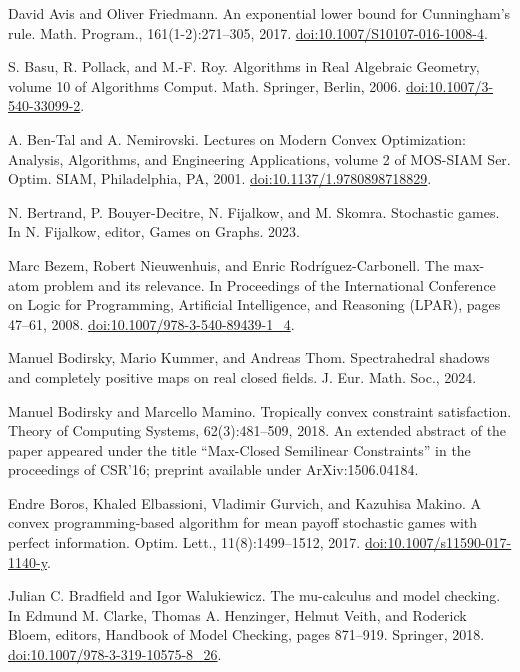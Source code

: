  David Avis and Oliver Friedmann. An exponential lower bound for Cunningham’s rule. Math. Program., 161(1-2):271–305, 2017. \href{https://doi.org/10.1007/S10107-016-1008-4}{doi:10.1007/S10107-016-1008-4}.

 S. Basu, R. Pollack, and M.-F. Roy. Algorithms in Real Algebraic Geometry, volume 10 of Algorithms Comput. Math. Springer, Berlin, 2006. \href{https://doi.org/10.1007/3-540-33099-2}{doi:10.1007/3-540-33099-2}.

 A. Ben-Tal and A. Nemirovski. Lectures on Modern Convex Optimization: Analysis, Algorithms, and Engineering Applications, volume 2 of MOS-SIAM Ser. Optim. SIAM, Philadelphia, PA, 2001. \href{https://doi.org/10.1137/1.9780898718829}{doi:10.1137/1.9780898718829}.

 N. Bertrand, P. Bouyer-Decitre, N. Fijalkow, and M. Skomra. Stochastic games. In N. Fijalkow, editor, Games on Graphs. 2023.

 Marc Bezem, Robert Nieuwenhuis, and Enric Rodríguez-Carbonell. The max-atom problem and its relevance. In Proceedings of the International Conference on Logic for Programming, Artificial Intelligence, and Reasoning (LPAR), pages 47–61, 2008. \href{https://doi.org/10.1007/978-3-540-89439-1_4}{doi:10.1007/978-3-540-89439-1\_4}.

 Manuel Bodirsky, Mario Kummer, and Andreas Thom. Spectrahedral shadows and completely positive maps on real closed fields. J. Eur. Math. Soc., 2024.

 Manuel Bodirsky and Marcello Mamino. Tropically convex constraint satisfaction. Theory of Computing Systems, 62(3):481–509, 2018. An extended abstract of the paper appeared under the title “Max-Closed Semilinear Constraints” in the proceedings of CSR’16; preprint available under ArXiv:1506.04184.

 Endre Boros, Khaled Elbassioni, Vladimir Gurvich, and Kazuhisa Makino. A convex programming-based algorithm for mean payoff stochastic games with perfect information. Optim. Lett., 11(8):1499–1512, 2017. \href{https://doi.org/10.1007/s11590-017-1140-y}{doi:10.1007/s11590-017-1140-y}.

 Julian C. Bradfield and Igor Walukiewicz. The mu-calculus and model checking. In Edmund M. Clarke, Thomas A. Henzinger, Helmut Veith, and Roderick Bloem, editors, Handbook of Model Checking, pages 871–919. Springer, 2018. \href{https://doi.org/10.1007/978-3-319-10575-8_26}{doi:10.1007/978-3-319-10575-8\_26}.

